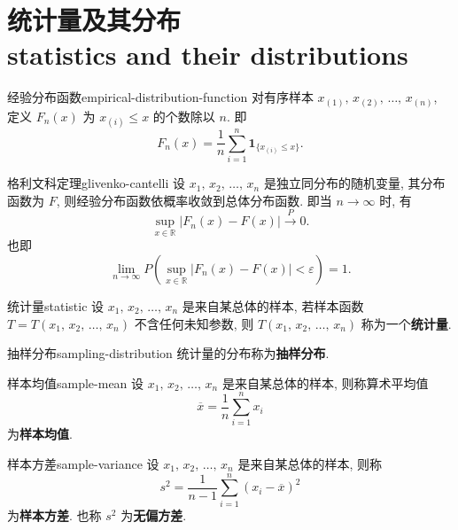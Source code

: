 \section{统计量及其分布 \\statistics and their distributions}

\begin{newdefbox}{经验分布函数}{empirical-distribution-function}
	对有序样本 $x_{(1)},\,x_{(2)},\,\dots,\,x_{(n)}$, 定义 $F_n(x)$ 为 $x_{(i)}\leq x$ 的个数除以 $n$.  即
	\[
		F_n(x)=\frac{1}{n}\sum_{i=1}^n\mathbf{1}_{\{x_{(i)}\leq x\}}.
		\]
\end{newdefbox}

\begin{newtheorembox}{格利文科定理}{glivenko-cantelli}
	设 $x_1,\,x_2,\,\dots,\,x_n$ 是独立同分布的随机变量, 其分布函数为 $F$, 则经验分布函数依概率收敛到总体分布函数.  即当 $n\to\infty$ 时, 有
	\[
		\sup_{x\in\mathbb{R}}|F_n(x)-F(x)|\xrightarrow{P}0.
	\]
	也即
	\[
		\lim_{n\to\infty}P\left(\sup_{x\in\mathbb{R}}|F_n(x)-F(x)|<\varepsilon\right)=1.
	\]
\end{newtheorembox}

\begin{newdefbox}{统计量}{statistic}
	设 $x_1,\,x_2,\,\dots,\,x_n$ 是来自某总体的样本, 若样本函数 $T=T(x_1,\,x_2,\,\dots,\,x_n)$ 不含任何未知参数, 则 $T(x_1,\,x_2,\,\dots,\,x_n)$ 称为一个\textbf{统计量}.
\end{newdefbox}

\begin{newdefbox}{抽样分布}{sampling-distribution}
	统计量的分布称为\textbf{抽样分布}.
\end{newdefbox}

\begin{newdefbox}{样本均值}{sample-mean}
	设 $x_1,\,x_2,\,\dots,\,x_n$ 是来自某总体的样本, 则称算术平均值
	\[
		\overline{x}=\frac{1}{n}\sum_{i=1}^nx_i
	\]
	为\textbf{样本均值}.
\end{newdefbox}

\begin{newdefbox}{样本方差}{sample-variance}
	设 $x_1,\,x_2,\,\dots,\,x_n$ 是来自某总体的样本, 则称
	\[
		s^2=\frac{1}{n-1}\sum_{i=1}^n(x_i-\overline{x})^2
	\]
	为\textbf{样本方差}.  也称 $s^2$ 为\textbf{无偏方差}.
\end{newdefbox}


